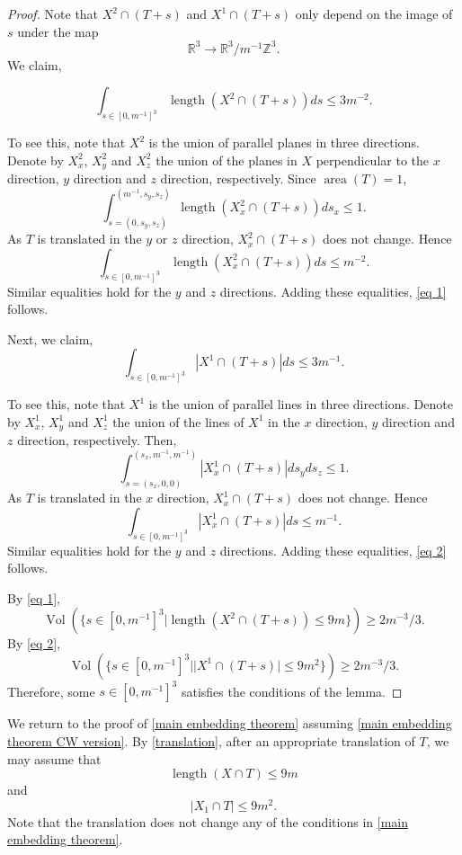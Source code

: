 \documentclass[12pt]{amsart}
\DeclareMathOperator*{\Area}{area}
\DeclareMathOperator*{\length}{length}
\DeclareMathOperator*{\Vol}{Vol}
\theoremstyle{definition}
\begin{document}
\begin{proof} Note that $X^2\cap (T+s)$ and $X^1\cap (T+s)$ only depend on the image of $s$ under the map $$\mathbb{R}^3\to \mathbb{R}^3/m^{-1}\mathbb{Z}^3.$$ We claim, 

\begin{equation}\label{eq 1}\int_{s\in [0,m^{-1}]^3}\length(X^2\cap (T+s))ds\leq 3m^{-2}.
\end{equation}

To see this, note that $X^2$ is the union of parallel planes in three directions. Denote by $X^2_x$, $X^2_y$ and $X^2_z$ the union of the planes in $X$ perpendicular to the $x$ direction, $y$ direction and $z$ direction, respectively. Since $\Area(T)=1$, 
$$\int_{s=(0,s_y,s_z)}^{(m^{-1},s_y,s_z)}\length{(X^2_x\cap (T+s))}ds_x\leq 1.
$$ As $T$ is translated in the $y$ or $z$ direction, $X^2_x\cap (T+s)$ does not change. Hence $$\int_{s\in[0,m^{-1}]^3}\length(X^2_x\cap (T+s))ds\leq m^{-2}.$$ Similar equalities hold for the $y$ and $z$ directions. Adding these equalities, \cref{eq 1} follows. 

Next, we claim, \begin{equation}\label{eq 2}\int_{s\in [0,m^{-1}]^3}|X^1\cap (T+s)|ds\leq 3m^{-1}.
\end{equation}

To see this, note that $X^1$ is the union of parallel lines in three directions. Denote by $X^1_x$, $X^1_y$ and $X^1_z$ the union of the lines of $X^1$ in the $x$ direction, $y$ direction and $z$ direction, respectively. Then, $$\int_{s=(s_x,0,0)}^{(s_x,m^{-1},m^{-1})} |X^1_x\cap (T+s)|ds_yds_z\leq 1.$$ As $T$ is translated in the $x$ direction, $X^1_x\cap (T+s)$ does not change. Hence $$\int_{s\in[0,m^{-1}]^3}|X^1_x\cap (T+s)|ds\leq m^{-1}.$$ Similar equalities hold for the $y$ and $z$ directions. Adding these equalities, \cref{eq 2} follows. 

By \cref{eq 1}, $$\Vol(\{s\in [0,m^{-1}]^3|\length(X^2\cap (T+s))\leq 9m\})\geq 2m^{-3}/3.$$ By \cref{eq 2}, $$\Vol(\{s\in [0,m^{-1}]^3||X^1\cap (T+s)|\leq 9m^2\})\geq 2m^{-3}/3.$$ Therefore, some $s\in [0,m^{-1}]^3$ satisfies the conditions of the lemma. 
\end{proof}

We return to the proof of \cref{main embedding theorem} assuming \cref{main embedding theorem CW version}. By \cref{translation}, after an appropriate translation of $T$, we may assume that 
\begin{equation*}\label{eq 3}\length(X\cap T)\leq 9 m
\end{equation*} and 
\begin{equation*}\label{eq 4}|X_1\cap T|\leq 9 m^2.
\end{equation*} Note that the translation does not change any of the conditions in \cref{main embedding theorem}. 
\end{document}
